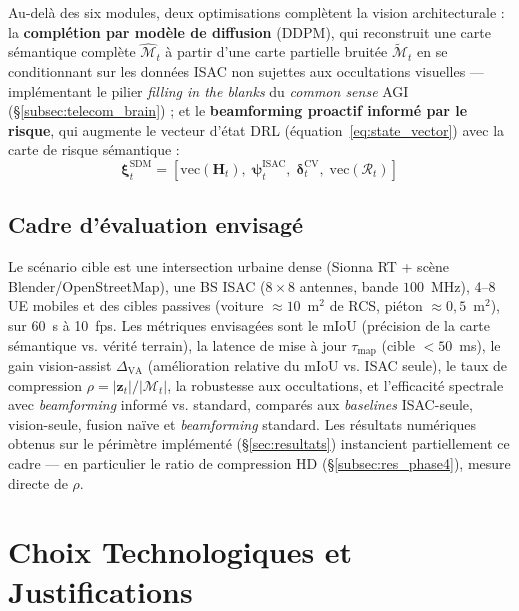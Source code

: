 \documentclass[12pt,a4paper,titlepage]{article}
\begin{document}
Au-delà des six modules, deux optimisations complètent la vision architecturale : la \textbf{complétion par modèle de diffusion} (DDPM), qui reconstruit une carte sémantique complète $\hat{\mathcal{M}}_t$ à partir d'une carte partielle bruitée $\tilde{\mathcal{M}}_t$ en se conditionnant sur les données ISAC non sujettes aux occultations visuelles --- implémentant le pilier \textit{filling in the blanks} du \textit{common sense} AGI (\S\ref{subsec:telecom_brain}) ; et le \textbf{beamforming proactif informé par le risque}, qui augmente le vecteur d'état DRL (équation~\eqref{eq:state_vector}) avec la carte de risque sémantique :
\begin{equation}
    \boldsymbol{\xi}_t^{\text{SDM}} = \left[ \mathrm{vec}(\mathbf{H}_t),\; \boldsymbol{\psi}_t^{\mathrm{ISAC}},\; \boldsymbol{\delta}_t^{\mathrm{CV}},\; \mathrm{vec}(\mathcal{R}_t) \right]
    \label{eq:state_vector_sdm}
\end{equation}

\subsection{Cadre d'évaluation envisagé}
\label{subsec:cadre_evaluation}

Le scénario cible est une intersection urbaine dense (Sionna RT + scène Blender/OpenStreetMap), une BS ISAC ($8\times8$ antennes, bande $100$~MHz), 4--8 UE mobiles et des cibles passives (voiture $\approx10$~m$^2$ de RCS, piéton $\approx0{,}5$~m$^2$), sur 60~s à 10~fps. Les métriques envisagées sont le mIoU (précision de la carte sémantique vs. vérité terrain), la latence de mise à jour $\tau_{\text{map}}$ (cible $<50$~ms), le gain vision-assist $\Delta_{\text{VA}}$ (amélioration relative du mIoU vs. ISAC seule), le taux de compression $\rho = |\mathbf{z}_t|/|\mathcal{M}_t|$, la robustesse aux occultations, et l'efficacité spectrale avec \textit{beamforming} informé vs. standard, comparés aux \textit{baselines} ISAC-seule, vision-seule, fusion naïve et \textit{beamforming} standard. Les résultats numériques obtenus sur le périmètre implémenté (\S\ref{sec:resultats}) instancient partiellement ce cadre --- en particulier le ratio de compression HD (\S\ref{subsec:res_phase4}), mesure directe de $\rho$.

\section{Choix Technologiques et Justifications}
\label{sec:choix_tech}
\end{document}

